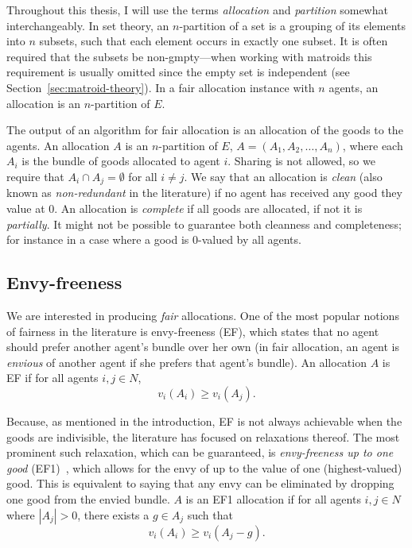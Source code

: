 Throughout this thesis, I will use the terms \textit{allocation} and \textit{partition} somewhat interchangeably. In set theory, an $n$-partition of a set is a grouping of its elements into $n$ subsets, such that each element occurs in exactly one subset. It is often required that the subsets be non-gmpty---when working with matroids this requirement is usually omitted since the empty set is independent (see Section~\ref{sec:matroid-theory}). In a fair allocation instance with $n$ agents, an allocation is an $n$-partition of $E$. 

The output of an algorithm for fair allocation is an allocation of the goods to the agents. An allocation $A$ is an $n$-partition of $E$, $A = (A_1, A_2, \dots, A_n)$, where each $A_i$ is the bundle of goods allocated to agent $i$. Sharing is not allowed, so we require that $A_i\cap A_j = \emptyset$ for all $i\neq j$. We say that an allocation is \textit{clean} (also known as \textit{non-redundant} in the literature) if no agent has received any good they value at 0. An allocation is \textit{complete} if all goods are allocated, if not it is \textit{partially}. It might not be possible to guarantee both cleanness and completeness; for instance in a case where a good is 0-valued by all agents.

\subsection{Envy-freeness}
We are interested in producing \textit{fair} allocations. One of the most popular notions of fairness in the literature is envy-freeness (EF), which states that no agent should prefer another agent's bundle over her own (in fair allocation, an agent is \textit{envious} of another agent if she prefers that agent's bundle). An allocation $A$ is EF if for all agents $i,j\in N$,
\begin{equation} \tag{EF}
  v_i(A_i) \geq v_i(A_j).
\end{equation}

Because, as mentioned in the introduction, EF is not always achievable when the goods are indivisible, the literature has focused on relaxations thereof. The most prominent such relaxation, which can be guaranteed, is \textit{envy-freeness up to one good} (EF1)~\cite{lipton-2004}, which allows for the envy of up to the value of one (highest-valued) good. This is equivalent to saying that any envy can be eliminated by dropping one good from the envied bundle. $A$ is an EF1 allocation if for all agents $i,j \in N$ where $|A_j| > 0$, there exists a $g \in A_j$ such that
\begin{equation} \tag{EF1}
  v_i(A_i) \geq v_i(A_j - g).
\end{equation}

